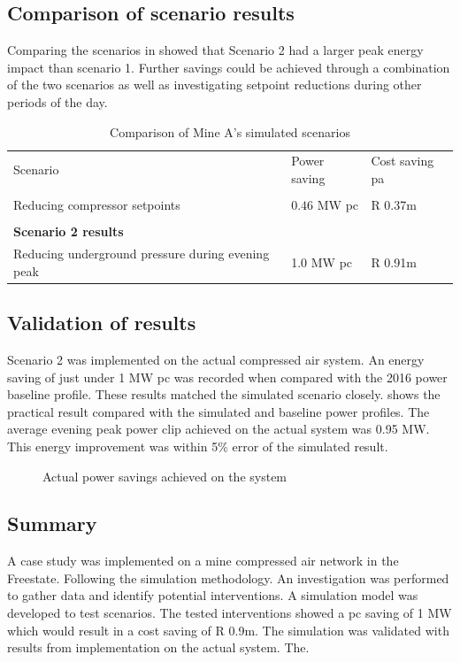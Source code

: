 \subsection{Comparison of scenario results}
Comparing the scenarios in  showed that Scenario 2 had a larger peak energy impact than scenario 1. Further savings could be achieved through a combination of the two scenarios as well as investigating setpoint reductions during other periods of the day.
\begin{table}[h!]
	\centering
	\begin{tabular}{p{}
			p{}
			p{}}
		\hline 
		Scenario & Power saving & Cost saving \gls{pa} \\
		\hhline{===} 
		\multicolumn{3}{l}{\textbf{Scenario 1 results}} \\
		Reducing compressor setpoints & $ 0.46 $ MW \gls{pc} & R 0.37m \\
		\\
		\multicolumn{3}{l}{\textbf{Scenario 2 results}} \\
		Reducing underground pressure during evening peak& 1.0 MW \gls{pc} & R 0.91m\\
		\hline
	\end{tabular}
	\caption{Comparison of Mine A's simulated scenarios}
	\label{Table: A Comparison}
\end{table}

\subsection{Validation of results}
Scenario 2 was implemented on the actual compressed air system. An energy saving of just under 1 MW \gls{pc} was recorded when compared with the 2016 power baseline profile. These results matched the simulated scenario closely.  shows the practical result compared with the simulated and baseline power profiles. The average evening peak power clip achieved on the actual system was 0.95 MW. This energy improvement was within 5\% error of the simulated result.
\begin{figure}[h!]
	\centering
	
	\caption{Actual power savings achieved on the system}
	\label{fig: Actual permormance beet}
\end{figure}
\subsection{Summary}
A case study was implemented on a mine compressed air network in the Freestate. Following the simulation methodology. An investigation was performed to gather data and identify potential interventions. A simulation model was developed to test scenarios. The tested interventions showed a \gls{pc} saving of 1 MW which would result in a cost saving of R 0.9m. The simulation was validated with results from implementation on the actual system. The.
